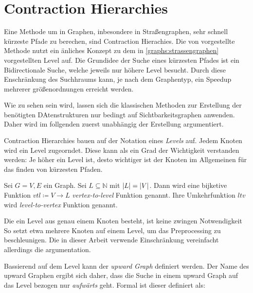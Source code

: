 \chapter{Contraction Hierarchies}\label{chapter:ch}

Eine Methode um in Graphen, inbesondere in Straßengraphen, sehr schnell kürzeste Pfade zu berechen, sind Contraction Hierachies.
Die von \cite{geisberger2008contraction} vorgestellte Methode nutzt ein änliches Konzept zu dem in \autoref{graphs:strassengraphen} vorgestellten Level auf.
Die Grundidee der Suche eines kürzesten Pfades ist ein Bidirectionale Suche, welche jeweils nur höhere Level besucht.
Durch diese Enschränkung des Suchhraums kann, je nach dem Graphentyp, ein Speedup mehrerer größenordnungen erreicht werden.

Wie zu sehen sein wird, lassen sich die klassischen Methoden zur Erstellung der benötigten DAtenstrukturen nur bedingt auf Sichtbarkeitsgraphen anwenden.
Daher wird im follgenden zuerst unabhängig der Erstellung argumentiert.

Contraction Hierarchies bauen auf der Notation eines \emph{Levels} auf.
Jedem Knoten wird ein Level zugeorndet.
Diese kann als ein Grad der Wichtigkeit verstanden werden:
Je höher ein Level ist, desto wichtiger ist der Knoten im Allgemeinen für das finden von kürzesten Pfaden.

\begin{definition}[Level]
    Sei $G = V, E$ ein Graph.
    Sei $L \subseteq \mathbb{N}$ mit $\abs{L} = \abs{V}$.
    Dann wird eine bijketive Funktion ${vtl} \coloneq V \to L$ \emph{vertex-to-level} Funktion genannt.
    Ihre Umkehrfunktion ${ltv}$ wird \emph{level-to-vertex} Funktion genannt.
\end{definition}

Die ein Level aus genau einem Knoten besteht, ist keine zwingen Notwendigkeit
So setzt \cite{vetter2009parallel} etwa mehrere Knoten auf einem Level, um das Preprocessing zu beschleunigen.
Die in dieser Arbeit verwende Einschränkung vereinfacht allerdings die argumentation.

Bassierend auf dem Level kann der \emph{upward Graph} definiert werden.
Der Name des upward Graphen ergibt sich daher, dass die Suche in einem upward Graph auf das Level bezogen nur \emph{aufwärts} geht.
Formal ist dieser definiert als:

